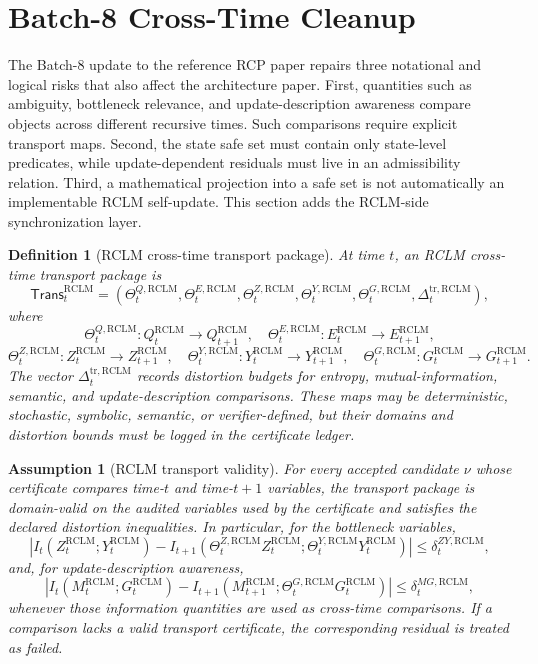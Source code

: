 \documentclass[11pt,a4paper]{article}
\newtheorem{definition}[theorem]{Definition}
\newtheorem{assumption}[theorem]{Assumption}
\newcommand{\RCLM}{\mathrm{RCLM}}
\begin{document}
\section{Batch-8 Cross-Time Cleanup}
\label{sec:batch8-cross-time-state-update-projection}

The Batch-8 update to the reference RCP paper repairs three notational and logical risks that also affect the architecture paper.  First, quantities such as ambiguity, bottleneck relevance, and update-description awareness compare objects across different recursive times.  Such comparisons require explicit transport maps.  Second, the state safe set must contain only state-level predicates, while update-dependent residuals must live in an admissibility relation.  Third, a mathematical projection into a safe set is not automatically an implementable RCLM self-update.  This section adds the RCLM-side synchronization layer.

\begin{definition}[RCLM cross-time transport package]
\label{def:rclm-cross-time-transport-package}
At time \(t\), an RCLM cross-time transport package is
\[
\mathsf{Trans}_t^{\RCLM}
=
(\Theta_t^{Q,\RCLM},\Theta_t^{E,\RCLM},\Theta_t^{Z,\RCLM},\Theta_t^{Y,\RCLM},\Theta_t^{G,\RCLM},\Delta_t^{\mathrm{tr},\RCLM}),
\]
where
\[
\Theta_t^{Q,\RCLM}:Q_t^{\RCLM}\to Q_{t+1}^{\RCLM},
\quad
\Theta_t^{E,\RCLM}:E_t^{\RCLM}\to E_{t+1}^{\RCLM},
\]
\[
\Theta_t^{Z,\RCLM}:Z_t^{\RCLM}\to Z_{t+1}^{\RCLM},
\quad
\Theta_t^{Y,\RCLM}:Y_t^{\RCLM}\to Y_{t+1}^{\RCLM},
\quad
\Theta_t^{G,\RCLM}:G_t^{\RCLM}\to G_{t+1}^{\RCLM}.
\]
The vector \(\Delta_t^{\mathrm{tr},\RCLM}\) records distortion budgets for entropy, mutual-information, semantic, and update-description comparisons.  These maps may be deterministic, stochastic, symbolic, semantic, or verifier-defined, but their domains and distortion bounds must be logged in the certificate ledger.
\end{definition}

\begin{assumption}[RCLM transport validity]
\label{ass:rclm-transport-validity}
For every accepted candidate \(\nu\) whose certificate compares time-\(t\) and time-\(t+1\) variables, the transport package is domain-valid on the audited variables used by the certificate and satisfies the declared distortion inequalities.  In particular, for the bottleneck variables,
\[
\left|
I_t(Z_t^{\RCLM};Y_t^{\RCLM})
-
I_{t+1}(\Theta_t^{Z,\RCLM}Z_t^{\RCLM};\Theta_t^{Y,\RCLM}Y_t^{\RCLM})
\right|
\le
\delta_t^{ZY,\RCLM},
\]
and, for update-description awareness,
\[
\left|
I_t(M_t^{\RCLM};G_t^{\RCLM})
-
I_{t+1}(M_{t+1}^{\RCLM};\Theta_t^{G,\RCLM}G_t^{\RCLM})
\right|
\le
\delta_t^{MG,\RCLM},
\]
whenever those information quantities are used as cross-time comparisons.  If a comparison lacks a valid transport certificate, the corresponding residual is treated as failed.
\end{assumption}
\end{document}
